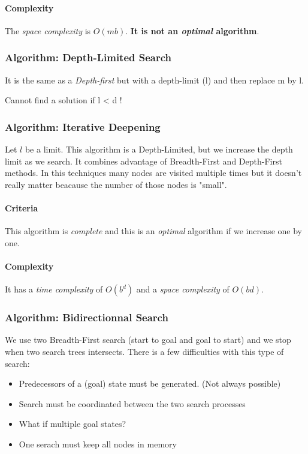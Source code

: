\paragraph{Complexity}
The \textit{space complexity} is $O(mb)$. \textbf{It is not an \textit{optimal} algorithm}.

\subsubsection{Algorithm: Depth-Limited Search}

It is the same as a \textit{Depth-first} but with a depth-limit (l) and
then replace m by l.

Cannot find a solution if l < d !

\subsubsection{Algorithm: Iterative Deepening}

Let $l$ be  a limit. This algorithm is a  Depth-Limited, but we increase
the depth limit as we search. It combines advantage of Breadth-First and
Depth-First methods. In this techniques  many nodes are visited multiple
times but it doesn't really matter beacause the number of those nodes is
"small".

\paragraph{Criteria} This algorithm is  \textit{complete} and this is an
\textit{optimal} algorithm if we increase one by one.

\paragraph{Complexity} It has a \textit{time complexity} of $O(b^d)$ and
a \textit{space complexity} of $O(bd)$.


\subsubsection{Algorithm: Bidirectionnal Search}

We  use two Breadth-First search (start to goal and goal to start)  and   we  stop  when  two  search  trees
intersects. There is a few difficulties with this type of search:

\begin{itemize}
    \item Predecessors of a (goal) state must be generated. (Not always possible)
    \item Search must be coordinated between the two search processes
    \item What if multiple goal states?
    \item One serach must keep all nodes in memory
\end{itemize} 

